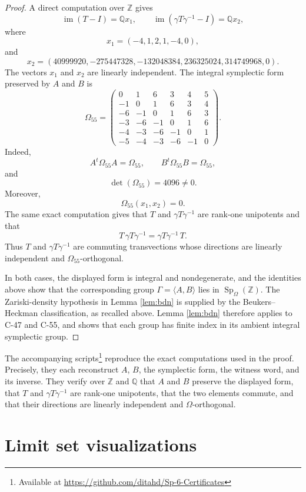 \documentclass[11pt]{article}
\DeclareMathOperator{\Sp}{Sp}
\newcommand{\ZZ}{\mathbb{Z}}
\newcommand{\QQ}{\mathbb{Q}}
\begin{document}
\begin{proof}
A direct computation over $\ZZ$ gives
\[
  \operatorname{im}(T-I)=\QQ x_1,\qquad
  \operatorname{im}(\gamma T\gamma^{-1}-I)=\QQ x_2,
\]
where
\[
  x_1=(-4,1,2,1,-4,0),
\]
and
\[
  x_2=(40999920,-275447328,-132048384,
       236325024,314749968,0).
\]
The vectors $x_1$ and $x_2$ are linearly independent. 
The integral
symplectic form preserved by $A$ and $B$ is
\[
\Omega_{55}=\begin{pmatrix}
0&1&6&3&4&5\\
-1&0&1&6&3&4\\
-6&-1&0&1&6&3\\
-3&-6&-1&0&1&6\\
-4&-3&-6&-1&0&1\\
-5&-4&-3&-6&-1&0
\end{pmatrix}.
\]
Indeed,
\[
  A^t\Omega_{55}A=\Omega_{55},\qquad
  B^t\Omega_{55}B=\Omega_{55},
\]
and
\[
  \det(\Omega_{55})=4096\neq 0.
\]
Moreover,
\[
  \Omega_{55}(x_1,x_2)=0.
\]
The same exact computation gives that $T$ and $\gamma T\gamma^{-1}$ are
rank-one unipotents and that
\[
  T \, \gamma T \gamma^{-1} = \gamma T \gamma^{-1} \, T . %
\]
Thus $T$ and $\gamma T\gamma^{-1}$ are commuting transvections whose
directions are linearly independent and $\Omega_{55}$-orthogonal.

In both cases, the displayed form is integral and nondegenerate, and the
identities above show that the corresponding group
$\Gamma=\langle A,B\rangle$ lies in $\Sp_\Omega(\ZZ)$.  The Zariski-density
hypothesis in Lemma \ref{lem:bdn} is supplied by the Beukers--Heckman
classification, as recalled above.  Lemma \ref{lem:bdn} therefore applies to
C-47 and C-55, and shows that each group has finite index in its ambient
integral symplectic group.
\end{proof}

The accompanying
scripts\footnote{Available at \url{https://github.com/ditahd/Sp-6-Certificates}} reproduce the exact computations used in the proof. Precisely, they each reconstruct $A$, $B$, the
symplectic form, the witness word, and its inverse.
They verify over $\ZZ$ and $\QQ$ that $A$ and $B$ preserve the displayed form,
that $T$ and $\gamma T\gamma^{-1}$ are rank-one unipotents, that the two
elements commute, and that their directions are linearly independent and
$\Omega$-orthogonal.





\section{Limit set visualizations}\label{sec:limitset}
\end{document}
